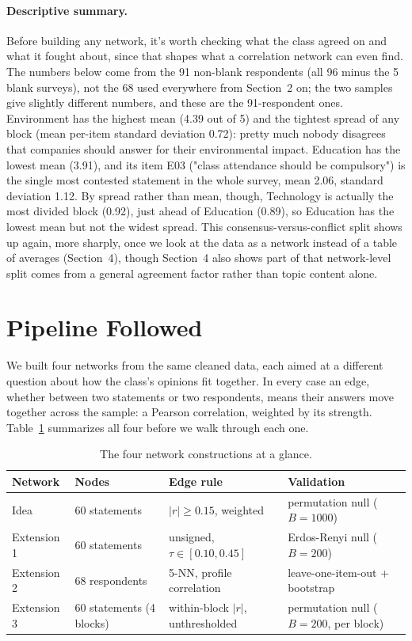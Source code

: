 \documentclass[11pt]{article}
\begin{document}
\paragraph{Descriptive summary.} Before building any network, it's worth checking what the class
agreed on and what it fought about, since that shapes what a correlation network can even find. The
numbers below come from the 91 non-blank respondents (all 96 minus the 5 blank surveys), not the 68
used everywhere from Section~2 on; the two samples give slightly different numbers, and these are the
91-respondent ones. Environment has the highest mean (4.39 out of 5) and the tightest spread of any
block (mean per-item standard deviation 0.72): pretty much nobody disagrees that companies should
answer for their environmental impact. Education has the lowest mean (3.91), and its item E03 ("class
attendance should be compulsory") is the single most contested statement in the whole survey, mean
2.06, standard deviation 1.12. By spread rather than mean, though, Technology is actually the most
divided block (0.92), just ahead of Education (0.89), so Education has the lowest mean but not the
widest spread. This consensus-versus-conflict split shows up again, more sharply, once we look at the
data as a network instead of a table of averages (Section~4), though Section~4 also shows part of that
network-level split comes from a general agreement factor rather than topic content alone.

\section{Pipeline Followed}

We built four networks from the same cleaned data, each aimed at a different question about how the
class's opinions fit together. In every case an edge, whether between two statements or two
respondents, means their answers move together across the sample: a Pearson correlation, weighted by
its strength. Table~\ref{tab:networks} summarizes all four before we walk through each one.

\begin{table}[htbp]
    \centering
    \caption{The four network constructions at a glance.}
    \label{tab:networks}
    \footnotesize
    \begin{tabularx}{\textwidth}{@{}lXXX@{}}
        \toprule
        Network & Nodes & Edge rule & Validation \\
        \midrule
        Idea & 60 statements & $|r| \geq 0.15$, weighted & permutation null ($B{=}1000$) \\
        Extension 1 & 60 statements & unsigned, $\tau \in [0.10, 0.45]$ & Erdos-Renyi null ($B{=}200$) \\
        Extension 2 & 68 respondents & 5-NN, profile correlation & leave-one-item-out + bootstrap \\
        Extension 3 & 60 statements (4 blocks) & within-block $|r|$, unthresholded & permutation null ($B{=}200$, per block) \\
        \bottomrule
    \end{tabularx}
\end{table}
\end{document}
